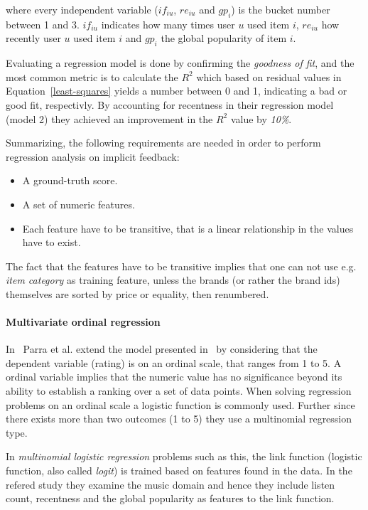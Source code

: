 where every independent variable ($if_{iu}$, $re_{iu}$ and $gp_{i}$) is the
bucket number between 1 and 3. $if_{iu}$ indicates how many times user $u$ used
item $i$, $re_{iu}$ how recently user $u$ used item $i$ and $gp_{i}$ the global
popularity of item $i$.

Evaluating a regression model is done by confirming the \textit{goodness of
fit}, and the most common metric is to calculate the $R^2$ which based on
residual values in Equation~\ref{least-squares} yields a number between 0 and
1, indicating a bad or good fit, respectivly. By accounting for recentness in
their regression model (model 2) they achieved an improvement in the $R^2$
value by \textit{10\%}.

Summarizing, the following requirements are needed in order to perform
regression analysis on implicit feedback:

\begin{itemize}
  \item A ground-truth score.
  \item A set of numeric features.
  \item Each feature have to be transitive, that is a linear relationship in
  the values have to exist.
\end{itemize}

The fact that the features have to be transitive implies that one can not use
e.g. \textit{item category} as training feature, unless the brands (or rather
the brand ids) themselves are sorted by price or equality, then renumbered.

\paragraph{Multivariate ordinal regression}
In~\cite{parra2011implicit} Parra et al. extend the model presented
in~\cite{parra2011walk} by considering that the dependent variable (rating) is
on an ordinal scale, that ranges from 1 to 5. A ordinal variable implies that
the numeric value has no significance beyond its ability to establish a ranking
over a set of data points. When solving regression problems on an ordinal scale
a logistic function is commonly used. Further since there exists more than two
outcomes (1 to 5) they use a multinomial regression type.

In \textit{multinomial logistic regression} problems such as this, the link
function (logistic function, also called \textit{logit}) is trained based on
features found in the data. In the refered study they examine the music domain
and hence they include listen count, recentness and the global popularity as
features to the link function.

